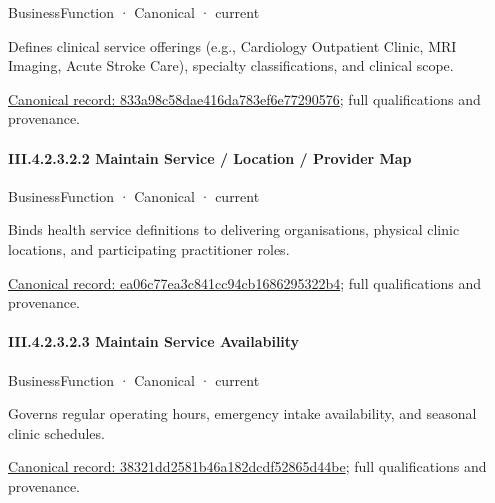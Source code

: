 \label{element:833a98c58dae416da783ef6e77290576}
{\small BusinessFunction · Canonical · current}\par

Defines clinical service offerings (e.g., Cardiology Outpatient Clinic, MRI Imaging, Acute Stroke Care), specialty classifications, and clinical scope.


{\footnotesize \href{../../../../../../../continuum/business/business-function/833a98c58dae416da783ef6e77290576.md}{Canonical record: 833a98c58dae416da783ef6e77290576}; full qualifications and provenance.}\par
\paragraph*{III.4.2.3.2.2 Maintain Service / Location / Provider Map}
\label{navigation:III.4.2.3.2.2}

\label{element:ea06c77ea3c841cc94cb1686295322b4}
{\small BusinessFunction · Canonical · current}\par

Binds health service definitions to delivering organisations, physical clinic locations, and participating practitioner roles.


{\footnotesize \href{../../../../../../../continuum/business/business-function/ea06c77ea3c841cc94cb1686295322b4.md}{Canonical record: ea06c77ea3c841cc94cb1686295322b4}; full qualifications and provenance.}\par
\paragraph*{III.4.2.3.2.3 Maintain Service Availability}
\label{navigation:III.4.2.3.2.3}

\label{element:38321dd2581b46a182dcdf52865d44be}
{\small BusinessFunction · Canonical · current}\par

Governs regular operating hours, emergency intake availability, and seasonal clinic schedules.


{\footnotesize \href{../../../../../../../continuum/business/business-function/38321dd2581b46a182dcdf52865d44be.md}{Canonical record: 38321dd2581b46a182dcdf52865d44be}; full qualifications and provenance.}\par

